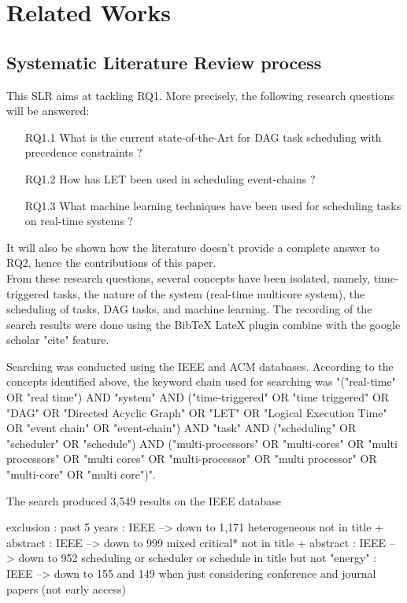 
\section{Related Works}
\label{sec:literature}

\subsection{Systematic Literature Review process}


This SLR aims at tackling RQ1. More precisely, the following research questions will be answered:

\begin{itemize}
    \item [RQ1.1] What is the current state-of-the-Art for DAG task scheduling with precedence constraints ?
    \item [RQ1.2] How has LET been used in scheduling event-chains ?
    \item [RQ1.3] What machine learning techniques have been used for scheduling tasks on real-time systems ?
\end{itemize}
It will also be shown how the literature doesn't provide 
a complete answer to RQ2, hence the contributions of this paper.\\

From these research questions, several concepts have been isolated,
namely, time-triggered tasks, the nature of the system (real-time multicore system),
the scheduling of tasks, DAG tasks, and machine learning.
The recording of the search results were done using the BibTeX LateX plugin
combine with the google scholar "cite" feature.

Searching was conducted using the IEEE and ACM databases.
According to the concepts identified above, 
the keyword chain used for searching was 
"("real-time" OR "real time") AND 
"system" AND ("time-triggered" OR "time triggered" OR "DAG" OR "Directed Acyclic Graph" OR "LET" OR "Logical Execution Time" OR "event chain" OR "event-chain") 
AND "task" 
AND ("scheduling" OR "scheduler" OR "schedule") 
AND ("multi-processors" OR "multi-cores" OR "multi processors" OR 
"multi cores" OR "multi-processor" OR "multi processor" OR 
"multi-core" OR "multi core")".

The search produced 3,549 results on the IEEE database

exclusion : past 5 years : IEEE --> down to 1,171 
            heterogeneous not in title + abstract : IEEE --> down to 999
            mixed critical* not in title + abstract : IEEE --> down to 952
            scheduling or scheduler or schedule in title but not "energy" :  IEEE --> down to 155 and 149 when just considering conference and journal papers (not early access)
            
